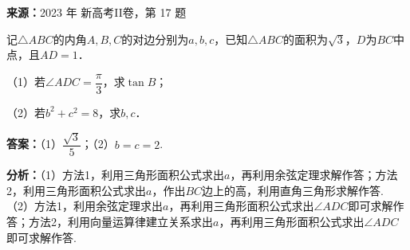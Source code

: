 \begin{question}[points=10]
\textbf{来源：}2023 年 新高考II卷，第 17 题\par
记$\triangle ABC$的内角$A,B,C$的对边分别为$a,b,c$，已知$\triangle ABC$的面积为$\sqrt{3}$，$D$为$BC$中点，且$AD=1$．

（1）若$\angle ADC=\dfrac{\pi}{3}$，求$\tan B$；

（2）若$b^{2}+c^{2}=8$，求$b,c$．
\begin{solution}
\textbf{答案：}（1）$\dfrac{\sqrt{3}}{5}$；（2）$b=c=2$.

\textbf{分析：}（1）方法1，利用三角形面积公式求出$a$，再利用余弦定理求解作答；方法2，利用三角形面积公式求出$a$，作出$BC$边上的高，利用直角三角形求解作答.
（2）方法1，利用余弦定理求出$a$，再利用三角形面积公式求出$\angle ADC$即可求解作答；方法2，利用向量运算律建立关系求出$a$，再利用三角形面积公式求出$\angle ADC$即可求解作答.


\end{solution}
\end{question}
